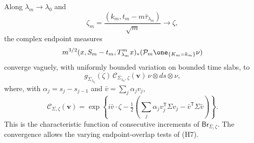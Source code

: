 \begin{lemma}
\label{lem:v36-local-block-probes}
Along $\lambda_m\to\lambda_0$ and
\[
 \zeta_m=\frac{(k_m,t_m-m\bar\tau_{\lambda_m})}{\sqrt m}
                  \longrightarrow\zeta,
\]
the complex endpoint measures
\begin{equation}\label{eq:v36-probed-endpoint-measure}
 m^{3/2}(x,S_m-t_m,T_{\lambda_m}^mx)_*
              (\mathcal P_m\one_{\{K_m=k_m\}}\nu)
\end{equation}
converge vaguely, with uniformly bounded variation on bounded time slabs, to
\[
 g_{\Sigma_{\lambda_0}}(\zeta)\,
 \mathcal C_{\Sigma_{\lambda_0},\zeta}(\mathbf v)\,
                      \nu\otimes ds\otimes\nu,
\]
where, with $\alpha_j=s_j-s_{j-1}$ and $\bar v=\sum_j\alpha_jv_j$,
\begin{equation}\label{eq:v36-bridge-characteristic}
 \mathcal C_{\Sigma,\zeta}(\mathbf v)
 =\exp\left\{i\bar v\cdot\zeta
       -\tfrac12\left(\sum_j\alpha_jv_j^{\mathsf T}\Sigma v_j
                                  -\bar v^{\mathsf T}\Sigma\bar v\right)\right\}.
\end{equation}
This is the characteristic function of consecutive increments of
$\mathsf{Br}_{\Sigma,\zeta}$. The convergence allows the varying
endpoint-overlap tests of \textup{(H7)}.
\end{lemma}
